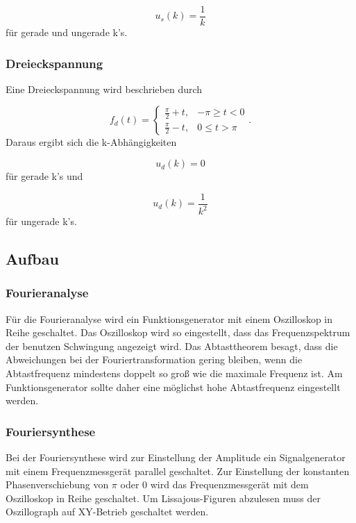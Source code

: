 \begin{equation}
  u_s(k) = \frac{1}{k}
\end{equation}
für gerade und ungerade k's.

\subsubsection{Dreieckspannung}

Eine Dreieckspannung wird beschrieben durch

\begin{equation}
  f_d(t) =
  \begin{cases}
    \frac{\pi}{2} + t, & -\pi \geq t < 0 \\
    \frac{\pi}{2} - t, & 0 \leq t > \pi
  \end{cases}.
\end{equation}
Daraus ergibt sich die k-Abhängigkeiten

\begin{equation}
  u_d(k) = 0
\end{equation}
für gerade k's und

\begin{equation}
  u_d(k) = \frac{1}{k^2}
\end{equation}
für ungerade k's.

\subsection{Aufbau}

\subsubsection{Fourieranalyse}
\label{sec:AufbauA}

Für die Fourieranalyse wird ein Funktionsgenerator mit einem Oszilloskop
in Reihe geschaltet. Das Oszilloskop wird so eingestellt, dass das
Frequenzspektrum der benutzen Schwingung angezeigt wird.
Das Abtasttheorem besagt, dass die Abweichungen bei der Fouriertransformation
gering bleiben, wenn die Abtastfrequenz mindestens doppelt so groß wie die
maximale Frequenz ist.
Am Funktionsgenerator sollte daher eine möglichst hohe Abtastfrequenz
eingestellt werden.


\subsubsection{Fouriersynthese}
\label{sec:AufbauS}

Bei der Fouriersynthese wird zur Einstellung der Amplitude ein
Signalgenerator mit einem Frequenzmessgerät parallel geschaltet. Zur Einstellung
der konstanten Phasenverschiebung von $\pi$ oder 0 wird das Frequenzmessgerät
mit dem Oszilloskop in Reihe geschaltet.
Um Lissajous-Figuren abzulesen muss der Oszillograph auf XY-Betrieb geschaltet
werden.


